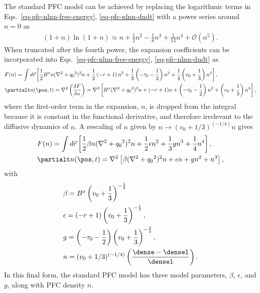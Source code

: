 The standard PFC model can be achieved by replacing the logarithmic terms in Eqs.~\ref{eq-pfc-nlnn-free-energy}, \ref{eq-pfc-nlnn-dndt} with a power series around $n = 0$ as
%
\begin{align}
(1+n)\ln(1+n) \approx n + \frac{1}{2}n^2 - \frac{1}{6}n^3 + \frac{1}{12}n^4 + \mathcal{O}(n^5).
\end{align}
%
When truncated after the fourth power, the expansion coefficients can be incorporated into Eqs.~\ref{eq-pfc-nlnn-free-energy}, \ref{eq-pfc-nlnn-dndt} as
%
\begin{subequations}
\begin{align}
& F(n) = \int d\vec{r} \left[ \frac{1}{2}B^x n (\nabla^2 + {q_0}^2)^2 n + \frac{1}{2} \left( -r + 1 \right)n^2 + \frac{1}{3} \left( -\tau_0 - \frac{1}{2} \right) n^3 + \frac{1}{4} \left( v_0 + \frac{1}{3} \right) n^4 \right], \\
& \partialt n(\pos, t) = \nabla^2 \left ( \frac{\delta F}{\delta n} \right ) = \nabla^2 \left[ B^x (\nabla^2 + {q_0}^2)^2 n + (-r + 1) n + \left( - \tau_0 - \frac{1}{2} \right) n^2 + \left( v_0 + \frac{1}{3} \right) n^3 \right],
\end{align}
\end{subequations}
%
where the first-order term in the expansion, $n$, is dropped from the integral because it is constant in the functional derivative, and therefore irrelevant to the diffusive dynamics of $n$.  A rescaling of $n$ given by $n \rightarrow (v_0 + 1/3)^{(-1/4)} n$ gives
%
\begin{subequations}
\begin{align}
& F(n) = \int d\vec{r} \left[ \frac{1}{2}\beta n (\nabla^2 + {q_0}^2)^2 n + \frac{1}{2} \epsilon n^2 + \frac{1}{3} g n^3 + \frac{1}{4} n^4 \right], \\
& \partialt n(\pos, t) = \nabla^2 \left[ \beta (\nabla^2 + {q_0}^2)^2 n + \epsilon n + g n^2 + n^3 \right],
\end{align}
\end{subequations}
%
with
%
\begin{subequations}\label{eq-std-pfc-model}
\begin{align}
& \beta = B^x \left(v_0 + \frac{1}{3} \right)^{-\frac{1}{2}} \label{eq-std-pfc-beta}  \\
& \epsilon = (-r + 1) \left(v_0 + \frac{1}{3} \right)^{-\frac{1}{2}}, \label{eq-std-pfc-epsilon} \\
& g = \left( -\tau_0 - \frac{1}{2} \right) \left(v_0 + \frac{1}{3} \right)^{-\frac{3}{4}}, \label{eq-std-pfc-g} \\
& n = (v_0 + 1/3)^{(-1/4)} \left( \frac{\dense - \densel}{\densel} \right). \label{eq-std-pfc-n}
\end{align}
\end{subequations}
%
In this final form, the standard PFC model has three model parameters, $\beta$, $\epsilon$, and $g$, along with PFC density $n$.

